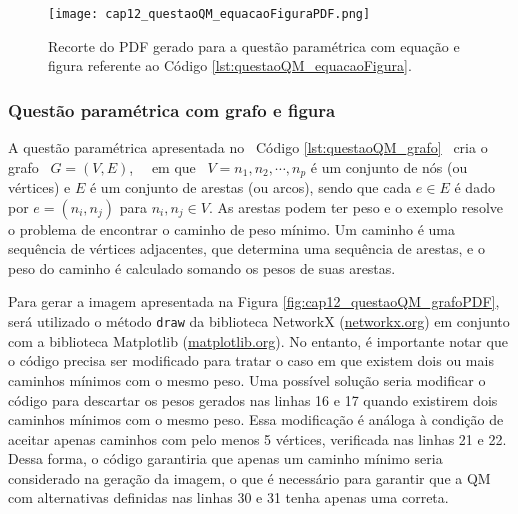 \begin{figure}[!ht]
  \texttt{[image: cap12\_questaoQM\_equacaoFiguraPDF.png]}
  \caption{Recorte do PDF gerado para a questão paramétrica com equação e figura referente ao Código \ref{lst:questaoQM_equacaoFigura}.}
  \label{fig:cap12_questaoQM_equacaoFiguraPDF}
\end{figure}


\subsubsection{Questão paramétrica com grafo e figura}\label{sec:grafo_figura}

A questão paramétrica  apresentada no \ Código \ref{lst:questaoQM_grafo} \ cria o grafo \  \(G = (V, E)\), \ \ em que \ \(V = {n_1, n_2, \cdots, n_p}\) é um conjunto de nós (ou vértices) e \(E\) é um conjunto de arestas (ou arcos), sendo que cada \(e \in E\) é dado por \(e = (n_i, n_j)\) para \(n_i, n_j \in V\). As arestas podem ter peso e o exemplo resolve o problema de encontrar o caminho de peso mínimo. Um caminho é uma sequência de vértices adjacentes, que determina uma sequência de arestas, e o peso do caminho é calculado somando os pesos de suas arestas.

Para gerar a imagem apresentada na Figura \ref{fig:cap12_questaoQM_grafoPDF}, será utilizado o método \verb|draw| da biblioteca NetworkX (\href{https://networkx.org/}{networkx.org}) em conjunto com a biblioteca Matplotlib (\href{https://matplotlib.org/}{matplotlib.org}). No entanto, é importante notar que o código precisa ser modificado para tratar o caso em que existem dois ou mais caminhos mínimos com o mesmo peso. Uma possível solução seria modificar o código para descartar os pesos gerados nas linhas 16 e 17 quando existirem dois caminhos mínimos com o mesmo peso. Essa modificação é análoga à condição de aceitar apenas caminhos com pelo menos 5 vértices, verificada nas linhas 21 e 22. Dessa forma, o código garantiria que apenas um caminho mínimo seria considerado na geração da imagem, o que é necessário para garantir que a QM com alternativas definidas nas linhas 30 e 31 tenha apenas uma correta.



